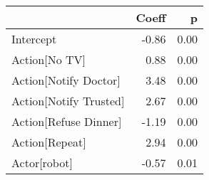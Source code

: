 \begin{tabular}{lrr}
\toprule
{} &  Coeff &    p \\
\midrule
Intercept                &  -0.86 & 0.00 \\
Action[No TV]          &   0.88 & 0.00 \\
Action[Notify Doctor]  &   3.48 & 0.00 \\
Action[Notify Trusted] &   2.67 & 0.00 \\
Action[Refuse Dinner]  &  -1.19 & 0.00 \\
Action[Repeat]         &   2.94 & 0.00 \\
Actor[robot]           &  -0.57 & 0.01 \\
\bottomrule
\end{tabular}
